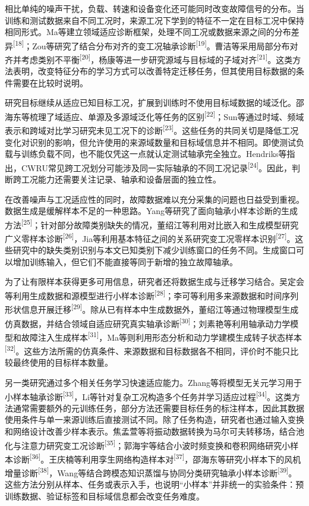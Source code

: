\documentclass[UTF8,12pt,openany,twoside]{ctexbook}
\numberwithin{equation}{chapter}
\begin{document}
相比单纯的噪声干扰，负载、转速和设备变化还可能同时改变故障信号的分布。当训练和测试数据来自不同工况时，来源工况下学到的特征不一定在目标工况中保持相同形式。Ma等建立领域适应诊断框架，处理不同工况或数据来源之间的分布差异\textsuperscript{[18]}；Zou等研究了结合分布对齐的变工况轴承诊断\textsuperscript{[19]}。曹洁等采用局部分布对齐并考虑类别不平衡\textsuperscript{[20]}，杨康等进一步研究源域与目标域的子域对齐\textsuperscript{[21]}。这类方法表明，改变特征分布的学习方式可以改善特定迁移任务，但其使用目标数据的条件需要在比较时说明。

研究目标继续从适应已知目标工况，扩展到训练时不使用目标域数据的域泛化。邵海东等梳理了域适应、单源及多源域泛化等任务的区别\textsuperscript{[22]}；Sun等通过时域、频域表示和跨域对比学习研究未见工况下的诊断\textsuperscript{[23]}。这些任务的共同关切是降低工况变化对识别的影响，但允许使用的来源域数量和目标域信息并不相同。即使测试负载与训练负载不同，也不能仅凭这一点就认定测试轴承完全独立。Hendriks等指出，CWRU常见跨工况划分可能涉及同一实际轴承的不同工况记录\textsuperscript{[24]}。因此，判断跨工况能力还需要关注记录、轴承和设备层面的独立性。

在改善噪声与工况适应性的同时，故障数据难以充分采集的问题也日益受到重视。数据生成是缓解样本不足的一种思路。Yang等研究了面向轴承小样本诊断的生成方法\textsuperscript{[25]}；针对部分故障类别缺失的情况，董绍江等利用对比嵌入和生成模型研究广义零样本诊断\textsuperscript{[26]}，Jia等利用基本特征之间的关系研究变工况零样本识别\textsuperscript{[27]}。这些研究中的缺失类别识别与本文已知类别下减少训练窗口的任务不同。生成窗口可以增加训练输入，但它们不能直接等同于新增的独立故障轴承。

为了让有限样本获得更多可用信息，研究者还将数据生成与迁移学习结合。吴定会等利用生成数据和源模型进行小样本诊断\textsuperscript{[28]}；李可等利用多来源数据和时间序列形状信息开展迁移\textsuperscript{[29]}。除从已有样本中生成数据外，董绍江等通过物理模型生成仿真数据，并结合领域自适应研究真实轴承诊断\textsuperscript{[30]}；刘素艳等利用轴承动力学模型和故障注入生成样本\textsuperscript{[31]}，Ma等则利用形态分析和动力学建模生成转子状态样本\textsuperscript{[32]}。这些方法所需的仿真条件、来源数据和目标数据各不相同，评价时不能只比较最终使用的目标样本数量。

另一类研究通过多个相关任务学习快速适应能力。Zhang等将模型无关元学习用于小样本轴承诊断\textsuperscript{[33]}，Li等针对复杂工况构造多个任务并学习适应过程\textsuperscript{[34]}。这类方法通常需要额外的元训练任务，部分方法还需要目标任务的标注样本，因此其数据使用条件与单一来源训练后直接测试不同。除了任务构造，研究者也通过输入变换和网络设计改善少样本表示。焦孟萱等将振动数据转换为马尔可夫转移场，结合池化与注意力研究变工况诊断\textsuperscript{[35]}；郭海宇等结合小波时频变换和卷积网络研究小样本诊断\textsuperscript{[36]}。王庆楠等利用孪生网络构造样本对\textsuperscript{[37]}，邵海东等研究小样本下的风机增量诊断\textsuperscript{[38]}，Wang等结合跨模态知识蒸馏与协同分类研究轴承小样本诊断\textsuperscript{[39]}。这些方法分别从样本、任务或表示入手，也说明“小样本”并非统一的实验条件：预训练数据、验证标签和目标域信息都会改变任务难度。
\end{document}
